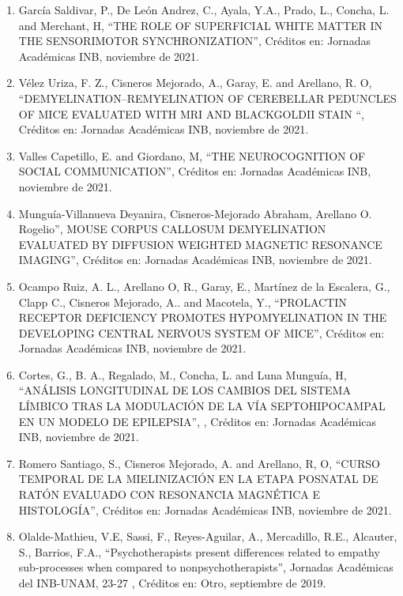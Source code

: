 \begin{enumerate}
\item García Saldivar, P., De León Andrez, C., Ayala, Y.A., Prado, L., Concha, L. and Merchant, H, “THE ROLE OF SUPERFICIAL 
WHITE MATTER IN THE SENSORIMOTOR SYNCHRONIZATION”, Créditos en: Jornadas Académicas INB, noviembre de 2021.

\item Vélez Uriza, F. Z., Cisneros Mejorado, A., Garay, E. and Arellano, R. O, “DEMYELINATION–REMYELINATION OF CEREBELLAR 
PEDUNCLES OF MICE EVALUATED WITH MRI AND BLACKGOLDII STAIN “, Créditos en: Jornadas Académicas INB, noviembre de 2021.

\item Valles Capetillo, E. and Giordano, M, “THE NEUROCOGNITION OF SOCIAL COMMUNICATION”, Créditos en: Jornadas Académicas 
INB, noviembre de 2021.

\item Munguía-Villanueva Deyanira, Cisneros-Mejorado Abraham, Arellano O. Rogelio”, MOUSE CORPUS CALLOSUM DEMYELINATION 
EVALUATED BY DIFFUSION WEIGHTED MAGNETIC RESONANCE IMAGING”, Créditos en: Jornadas Académicas INB, noviembre de 2021.

\item Ocampo Ruiz, A. L., Arellano O, R., Garay, E., Martínez de la Escalera, G., Clapp C., Cisneros Mejorado, A.. and 
Macotela, Y., “PROLACTIN RECEPTOR DEFICIENCY PROMOTES HYPOMYELINATION IN THE DEVELOPING CENTRAL NERVOUS SYSTEM OF MICE”, 
Créditos en: Jornadas Académicas INB, noviembre de 2021.

\item Cortes, G., B. A., Regalado, M., Concha, L. and Luna Munguía, H, “ANÁLISIS LONGITUDINAL DE LOS CAMBIOS DEL SISTEMA 
LÍMBICO TRAS LA MODULACIÓN DE LA VÍA SEPTOHIPOCAMPAL EN UN MODELO DE EPILEPSIA”, , Créditos en: Jornadas Académicas INB, 
noviembre de 2021.

\item Romero Santiago, S., Cisneros Mejorado, A. and Arellano, R, O, “CURSO TEMPORAL DE LA MIELINIZACIÓN EN LA ETAPA 
POSNATAL DE RATÓN EVALUADO CON RESONANCIA MAGNÉTICA E HISTOLOGÍA”, Créditos en: Jornadas Académicas INB, noviembre de 
2021.

\item Olalde-Mathieu, V.E, Sassi, F., Reyes-Aguilar, A., Mercadillo, R.E., Alcauter, S., Barrios, F.A., “Psychotherapists 
present differences related to empathy sub-processes when compared to nonpsychotherapists”, Jornadas Académicas del 
INB-UNAM, 23-27 , Créditos en: Otro, septiembre de 2019.


\end{enumerate}
